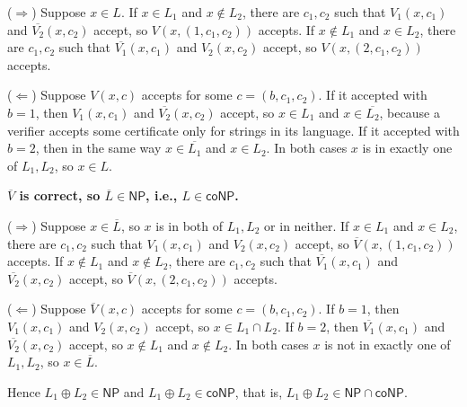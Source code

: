\documentclass[11pt]{article}
\newcommand{\NP}{\textsf{NP}}
\newcommand{\coNP}{\textsf{coNP}}
\begin{document}
($\Longrightarrow$) Suppose $x \in L$.
If $x \in L_1$ and $x \notin L_2$, there are $c_1, c_2$ such that $V_1(x, c_1)$ and $\overline{V_2}(x, c_2)$ accept, so $V(x, (1, c_1, c_2))$ accepts.
If $x \notin L_1$ and $x \in L_2$, there are $c_1, c_2$ such that $\overline{V_1}(x, c_1)$ and $V_2(x, c_2)$ accept, so $V(x, (2, c_1, c_2))$ accepts.

($\Longleftarrow$) Suppose $V(x, c)$ accepts for some $c = (b, c_1, c_2)$.
If it accepted with $b = 1$, then $V_1(x, c_1)$ and $\overline{V_2}(x, c_2)$ accept, so $x \in L_1$ and $x \in \overline{L_2}$, because a verifier accepts some certificate only for strings in its language.
If it accepted with $b = 2$, then in the same way $x \in \overline{L_1}$ and $x \in L_2$.
In both cases $x$ is in exactly one of $L_1, L_2$, so $x \in L$.

\textbf{$\overline{V}$ is correct, so $\overline{L} \in \NP$, i.e., $L \in \coNP$.}

($\Longrightarrow$) Suppose $x \in \overline{L}$, so $x$ is in both of $L_1, L_2$ or in neither.
If $x \in L_1$ and $x \in L_2$, there are $c_1, c_2$ such that $V_1(x, c_1)$ and $V_2(x, c_2)$ accept, so $\overline{V}(x, (1, c_1, c_2))$ accepts.
If $x \notin L_1$ and $x \notin L_2$, there are $c_1, c_2$ such that $\overline{V_1}(x, c_1)$ and $\overline{V_2}(x, c_2)$ accept, so $\overline{V}(x, (2, c_1, c_2))$ accepts.

($\Longleftarrow$) Suppose $\overline{V}(x, c)$ accepts for some $c = (b, c_1, c_2)$.
If $b = 1$, then $V_1(x, c_1)$ and $V_2(x, c_2)$ accept, so $x \in L_1 \cap L_2$.
If $b = 2$, then $\overline{V_1}(x, c_1)$ and $\overline{V_2}(x, c_2)$ accept, so $x \notin L_1$ and $x \notin L_2$.
In both cases $x$ is not in exactly one of $L_1, L_2$, so $x \in \overline{L}$.

Hence $L_1 \oplus L_2 \in \NP$ and $L_1 \oplus L_2 \in \coNP$, that is, $L_1 \oplus L_2 \in \NP \cap \coNP$.
\end{document}
